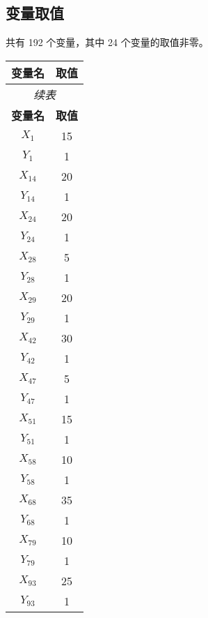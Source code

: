\documentclass[a4paper,10pt]{article}
\begin{document}
\subsection{变量取值}

共有 192 个变量，其中 24 个变量的取值非零。

\begin{center}
\begin{longtable}{cc}
\toprule
\textbf{变量名} & \textbf{取值} \\
\midrule
\endfirsthead
\multicolumn{2}{c}{\textit{续表}} \\
\toprule
\textbf{变量名} & \textbf{取值} \\
\midrule
\endhead
\bottomrule
\endfoot
\bottomrule
\endlastfoot
$X_{1}$ & 15 \\
$Y_{1}$ & 1 \\
$X_{14}$ & 20 \\
$Y_{14}$ & 1 \\
$X_{24}$ & 20 \\
$Y_{24}$ & 1 \\
$X_{28}$ & 5 \\
$Y_{28}$ & 1 \\
$X_{29}$ & 20 \\
$Y_{29}$ & 1 \\
$X_{42}$ & 30 \\
$Y_{42}$ & 1 \\
$X_{47}$ & 5 \\
$Y_{47}$ & 1 \\
$X_{51}$ & 15 \\
$Y_{51}$ & 1 \\
$X_{58}$ & 10 \\
$Y_{58}$ & 1 \\
$X_{68}$ & 35 \\
$Y_{68}$ & 1 \\
$X_{79}$ & 10 \\
$Y_{79}$ & 1 \\
$X_{93}$ & 25 \\
$Y_{93}$ & 1 \\
\end{longtable}
\end{center}
\end{document}
